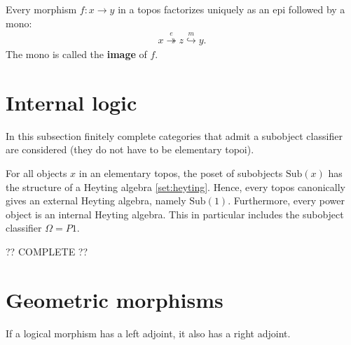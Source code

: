     \begin{property}
        Every morphism $f:x\rightarrow y$ in a topos factorizes uniquely as an epi followed by a mono:
        \begin{gather}
            x\overset{e}{\twoheadrightarrow}z\overset{m}{\hookrightarrow}y.
        \end{gather}
        The mono is called the \textbf{image} of $f$.
    \end{property}

\section{Internal logic}\label{section:internal_logic}

    In this subsection finitely complete categories that admit a subobject classifier are considered (they do not have to be elementary topoi).


    \begin{property}
        For all objects $x$ in an elementary topos, the poset of subobjects $\mathrm{Sub}(x)$ has the structure of a Heyting algebra \ref{set:heyting}. Hence, every topos canonically gives an external Heyting algebra, namely $\mathrm{Sub}(1)$. Furthermore, every power object is an internal Heyting algebra. This in particular includes the subobject classifier $\Omega=P1$.
    \end{property}

    ?? COMPLETE ??

\section{Geometric morphisms}


    \begin{property}
        If a logical morphism has a left adjoint, it also has a right adjoint.
    \end{property}

